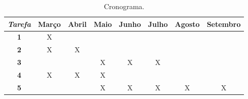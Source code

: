 \begin{table}
\begin{center}
\begin{small}
\begin{tabular}{|c|c|c|c|c|c|c|c|}
\hline
\emph{Tarefa} &
Março &
Abril &
Maio &
Junho &
Julho &
Agosto &
Setembro \\ \hline
\textbf{1} & X &  &  &  &  &  &  \\ \hline
\textbf{2} & X & X &  &  &  &  &  \\ \hline
\textbf{3} &  &  & X & X & X &  &  \\ \hline
\textbf{4} & X & X & X &  &  &  &  \\ \hline
\textbf{5} &  &  & X & X & X & X & X \\ \hline
\end{tabular}
\caption{Cronograma.}
\label{tab:tab:F5}
\end{small}
\end{center}
\end{table}
